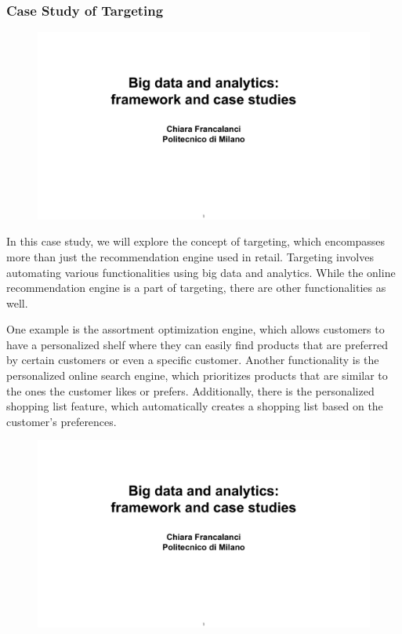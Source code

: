 \subsubsection{Case Study of Targeting}

\begin{figure}[!h]
  \centering
  \includegraphics[page=89, trim = 0cm 3cm 1.5cm 4.3cm, clip, width=\imagewidth]{images/06 - BIG_DATA.pdf}
\end{figure}

In this case study, we will explore the concept of targeting, which
encompasses more than just the recommendation engine used in retail.
Targeting involves automating various functionalities using big data and
analytics. While the online recommendation engine is a part of
targeting, there are other functionalities as well.

One example is the assortment optimization engine, which allows
customers to have a personalized shelf where they can easily find
products that are preferred by certain customers or even a specific
customer. Another functionality is the personalized online search
engine, which prioritizes products that are similar to the ones the
customer likes or prefers. Additionally, there is the personalized
shopping list feature, which automatically creates a shopping list based
on the customer's preferences.

\begin{figure}[!h]
  \centering
  \includegraphics[page=95, trim = 1.5cm 3.5cm 1.5cm 4cm, clip, width=\imagewidth]{images/06 - BIG_DATA.pdf}
\end{figure}

